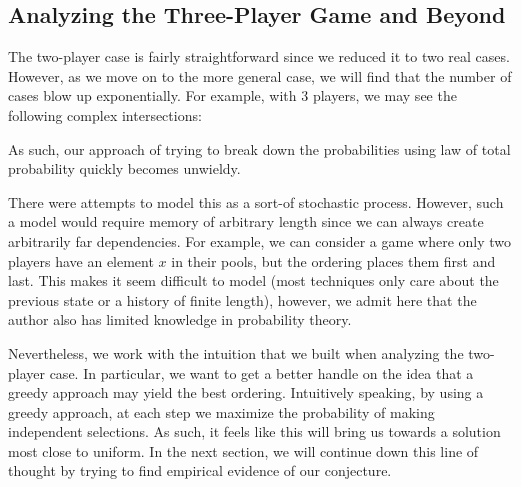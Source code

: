 \subsection{Analyzing the Three-Player Game and Beyond}

The two-player case is fairly straightforward since we reduced it to two real cases.
However, as we move on to the more general case, we will find that the number of cases blow up exponentially.
For example, with 3 players, we may see the following complex intersections:

\begin{minipage}{\textwidth}
    \centering
\end{minipage}

As such, our approach of trying to break down the probabilities using law of total probability quickly becomes unwieldy.

There were attempts to model this as a sort-of stochastic process.
However, such a model would require memory of arbitrary length since we can always create arbitrarily far dependencies.
For example, we can consider a game where only two players have an element $x$ in their pools, but the ordering places them first and last.
This makes it seem difficult to model (most techniques only care about the previous state or a history of finite length), however, we admit here that the author also has limited knowledge in probability theory.

Nevertheless, we work with the intuition that we built when analyzing the two-player case.
In particular, we want to get a better handle on the idea that a greedy approach may yield the best ordering.
Intuitively speaking, by using a greedy approach, at each step we maximize the probability of making independent selections.
As such, it feels like this will bring us towards a solution most close to uniform.
In the next section, we will continue down this line of thought by trying to find empirical evidence of our conjecture.